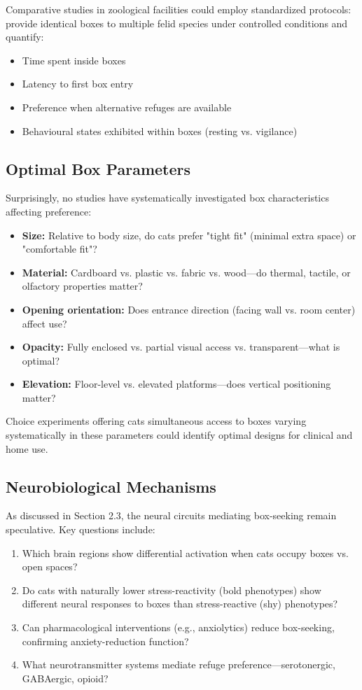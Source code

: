 \documentclass[12pt,a4paper]{article}
\begin{document}
Comparative studies in zoological facilities could employ standardized protocols: provide identical boxes to multiple felid species under controlled conditions and quantify:
\begin{itemize}
    \item Time spent inside boxes
    \item Latency to first box entry
    \item Preference when alternative refuges are available
    \item Behavioural states exhibited within boxes (resting vs. vigilance)
\end{itemize}

\subsection{Optimal Box Parameters}

Surprisingly, no studies have systematically investigated box characteristics affecting preference:

\begin{itemize}
    \item \textbf{Size:} Relative to body size, do cats prefer "tight fit" (minimal extra space) or "comfortable fit"?
    \item \textbf{Material:} Cardboard vs. plastic vs. fabric vs. wood—do thermal, tactile, or olfactory properties matter?
    \item \textbf{Opening orientation:} Does entrance direction (facing wall vs. room center) affect use?
    \item \textbf{Opacity:} Fully enclosed vs. partial visual access vs. transparent—what is optimal?
    \item \textbf{Elevation:} Floor-level vs. elevated platforms—does vertical positioning matter?
\end{itemize}

Choice experiments offering cats simultaneous access to boxes varying systematically in these parameters could identify optimal designs for clinical and home use.

\subsection{Neurobiological Mechanisms}

As discussed in Section 2.3, the neural circuits mediating box-seeking remain speculative. Key questions include:

\begin{enumerate}
    \item Which brain regions show differential activation when cats occupy boxes vs. open spaces?
    \item Do cats with naturally lower stress-reactivity (bold phenotypes) show different neural responses to boxes than stress-reactive (shy) phenotypes?
    \item Can pharmacological interventions (e.g., anxiolytics) reduce box-seeking, confirming anxiety-reduction function?
    \item What neurotransmitter systems mediate refuge preference—serotonergic, GABAergic, opioid?
\end{enumerate}
\end{document}

